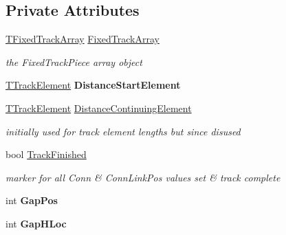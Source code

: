 \subsection*{Private Attributes}
\begin{DoxyCompactItemize}
\item 
\mbox{\label{class_t_track_aa518e921b7809730b4b43e96f7136817}} 
\mbox{\hyperlink{class_t_track_1_1_t_fixed_track_array}{T\+Fixed\+Track\+Array}} \mbox{\hyperlink{class_t_track_aa518e921b7809730b4b43e96f7136817}{Fixed\+Track\+Array}}
\begin{DoxyCompactList}\small\item\em the Fixed\+Track\+Piece array object \end{DoxyCompactList}\item 
\mbox{\label{class_t_track_a87d65b786df282006e60c97826095892}} 
\mbox{\hyperlink{class_t_track_element}{T\+Track\+Element}} {\bfseries Distance\+Start\+Element}
\item 
\mbox{\label{class_t_track_a8a68b341049d8b5c05b626fed08cdb33}} 
\mbox{\hyperlink{class_t_track_element}{T\+Track\+Element}} \mbox{\hyperlink{class_t_track_a8a68b341049d8b5c05b626fed08cdb33}{Distance\+Continuing\+Element}}
\begin{DoxyCompactList}\small\item\em initially used for track element lengths but since disused \end{DoxyCompactList}\item 
\mbox{\label{class_t_track_a3129d1f4b765dea2a15dab78e5e58129}} 
bool \mbox{\hyperlink{class_t_track_a3129d1f4b765dea2a15dab78e5e58129}{Track\+Finished}}
\begin{DoxyCompactList}\small\item\em marker for all Conn \& Conn\+Link\+Pos values set \& track complete \end{DoxyCompactList}\item 
\mbox{\label{class_t_track_a19b95a52149a0cab545fddace312e0cc}} 
int {\bfseries Gap\+Pos}
\item 
\mbox{\label{class_t_track_af57a8d2b11f3618b0502cd757fa41541}} 
int {\bfseries Gap\+H\+Loc}
\item 

\end{DoxyCompactItemize}
